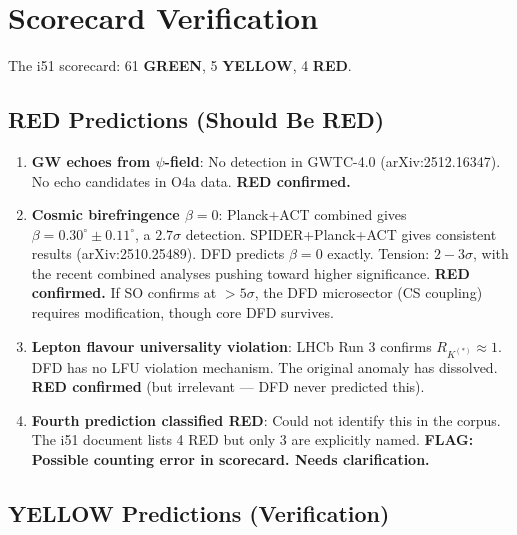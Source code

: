 \documentclass[11pt,a4paper]{article}
\newcommand{\GREEN}{\textcolor{dfdgreen}{\textbf{GREEN}}}
\newcommand{\YELLOW}{\textcolor{dfdyellow}{\textbf{YELLOW}}}
\newcommand{\RED}{\textcolor{dfdred}{\textbf{RED}}}
\begin{document}
\section{Scorecard Verification}

The i51 scorecard: 61 \GREEN, 5 \YELLOW, 4 \RED.

\subsection{RED Predictions (Should Be RED)}

\begin{enumerate}
\item \textbf{GW echoes from $\psi$-field}: No detection in GWTC-4.0 (arXiv:2512.16347). No echo candidates in O4a data. \textbf{RED confirmed.}

\item \textbf{Cosmic birefringence $\beta = 0$}: Planck+ACT combined gives $\beta = 0.30^\circ \pm 0.11^\circ$, a $2.7\sigma$ detection. SPIDER+Planck+ACT gives consistent results (arXiv:2510.25489). DFD predicts $\beta = 0$ exactly. Tension: $2-3\sigma$, with the recent combined analyses pushing toward higher significance. \textbf{RED confirmed.} If SO confirms at $>5\sigma$, the DFD microsector (CS coupling) requires modification, though core DFD survives.

\item \textbf{Lepton flavour universality violation}: LHCb Run 3 confirms $R_{K^{(*)}} \approx 1$. DFD has no LFU violation mechanism. The original anomaly has dissolved. \textbf{RED confirmed} (but irrelevant --- DFD never predicted this).

\item \textbf{Fourth prediction classified RED}: Could not identify this in the corpus. The i51 document lists 4 RED but only 3 are explicitly named. \textbf{FLAG: Possible counting error in scorecard. Needs clarification.}
\end{enumerate}

\subsection{YELLOW Predictions (Verification)}
\end{document}
